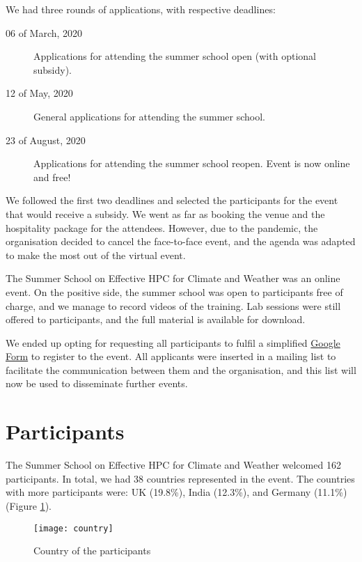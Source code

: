 We had three rounds of applications, with respective deadlines:

\begin{description}

\item[06 of March, 2020] Applications for attending the summer school open (with optional subsidy).

\item[12 of May, 2020] General applications for attending the summer school.

\item[23 of August, 2020] Applications for attending the summer school reopen. Event is now online and free!

\end{description}

We followed the first two deadlines and selected the participants for the event that would receive a subsidy. We went as far as booking the venue and the hospitality package for the attendees. However, due to the pandemic, the organisation decided to cancel the face-to-face event, and the agenda was adapted to make the most out of the virtual event.

The Summer School on Effective HPC for Climate and Weather was an online event. On the positive side, the summer school was open to participants free of charge, and we manage to record videos of the training. Lab sessions were still offered to participants, and the full material is available for download.

We ended up opting for requesting all participants to fulfil a simplified \href{https://docs.google.com/forms/d/1jytBiXi3RMdmnzyZc08L82krIhWzetWH909enjLhm9E/}{Google Form} to register to the event. All applicants were inserted in a mailing list to facilitate the communication between them and the organisation, and this list will now be used to disseminate further events.

\section{Participants}

The Summer School on Effective HPC for Climate and Weather welcomed 162 participants. In total, we had 38 countries represented in the event. The countries with more participants were: UK (19.8\%), India (12.3\%), and Germany (11.1\%) (Figure \ref{fig:country}).

\begin{figure}[H]
\centering
\texttt{[image: country]}
\caption{\label{fig:country} Country of the participants}
\end{figure}

